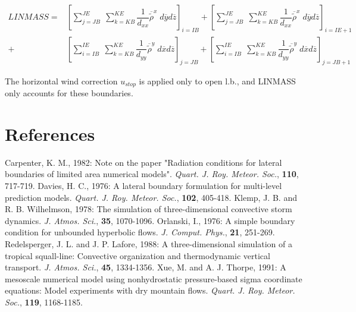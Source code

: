 \begin{eqnarray}
LINMASS  = &
 \left[{ \sum_{j=JB}^{JE} \; \sum_{k=KB}^{KE}
 \dfrac{1}{d_{xx} } \overline{  {\tilde{\rho} } }^{x} \;
d{\overline{y}} d{\overline{z}} }\right]_{i=IB}
+\left[{ \sum_{j=JB}^{JE} \; \sum_{k=KB}^{KE}
 \dfrac{1}{d_{xx} } \overline{  {\tilde{\rho} } }^{x} \;
d{\overline{y}} d{\overline{z}} }\right]_{i=IE+1}
\nonumber \\
+&\left[{ \sum_{i=IB}^{IE} \; \sum_{k=KB}^{KE}
 \dfrac{1}{d_{yy} } \overline{  {\tilde{\rho} } }^{y} \;
d{\overline{x}} d{\overline{z}} }\right]_{j=JB}
+\left[{ \sum_{i=IB}^{IE} \; \sum_{k=KB}^{KE}
 \dfrac{1}{d_{yy} } \overline{  {\tilde{\rho} } }^{y} \;
d{\overline{x}} d{\overline{z}} }\right]_{j=JB+1}
\end{eqnarray}

 The horizontal wind correction $u_{stop}$ is
applied only to open l.b., and LINMASS only accounts for these boundaries.


\section{References}
\decrefname
Carpenter, K. M., 1982:
Note on the paper "Radiation conditions for lateral boundaries
of limited area numerical models".
{\it Quart. J. Roy. Meteor. Soc.}, {\bf 110}, 717-719.
\decrefname
Davies, H. C., 1976:
A lateral boundary formulation for multi-level prediction models.
{\it Quart. J. Roy. Meteor. Soc.}, {\bf 102}, 405-418.
\decrefname
Klemp, J. B. and R. B. Wilhelmson, 1978:
The simulation of three-dimensional convective storm dynamics.
{\it J. Atmos. Sci.}, {\bf 35}, 1070-1096.
\decrefname
Orlanski, I., 1976:
A simple boundary condition for unbounded hyperbolic flows.
{\it J. Comput. Phys.}, {\bf 21}, 251-269.
\decrefname
Redelsperger, J. L. and J. P. Lafore, 1988:
A three-dimensional simulation of a tropical squall-line:
Convective organization and thermodynamic vertical transport.
{\it J. Atmos. Sci.}, {\bf 45}, 1334-1356.
\decrefname
Xue, M. and A. J. Thorpe, 1991:
A mesoscale numerical model using nonhydrostatic pressure-based sigma
coordinate equations: Model experiments with dry mountain flows.
{\it Quart. J. Roy. Meteor. Soc.}, {\bf 119}, 1168-1185.

